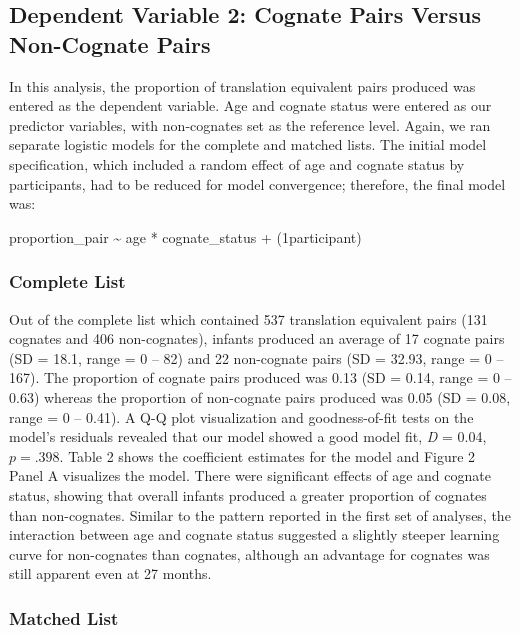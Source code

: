 \documentclass[
  ,man,floatsintext]{apa6}
\begin{document}
\hypertarget{dependent-variable-2-cognate-pairs-versus-non-cognate-pairs}{%
\subsection{Dependent Variable 2: Cognate Pairs Versus Non-Cognate Pairs}\label{dependent-variable-2-cognate-pairs-versus-non-cognate-pairs}}

In this analysis, the proportion of translation equivalent pairs produced was entered as the dependent variable. Age and cognate status were entered as our predictor variables, with non-cognates set as the reference level. Again, we ran separate logistic models for the complete and matched lists. The initial model specification, which included a random effect of age and cognate status by participants, had to be reduced for model convergence; therefore, the final model was:

proportion\_pair \textasciitilde{} age * cognate\_status + (1\textbar participant)

\hypertarget{complete-list-1}{%
\subsubsection{Complete List}\label{complete-list-1}}

Out of the complete list which contained 537 translation equivalent pairs (131 cognates and 406 non-cognates), infants produced an average of 17 cognate pairs (SD = 18.1, range = 0 -- 82) and 22 non-cognate pairs (SD = 32.93, range = 0 -- 167). The proportion of cognate pairs produced was 0.13 (SD = 0.14, range = 0 -- 0.63) whereas the proportion of non-cognate pairs produced was 0.05 (SD = 0.08, range = 0 -- 0.41). A Q-Q plot visualization and goodness-of-fit tests on the model's residuals revealed that our model showed a good model fit, \emph{D} = 0.04, \(p = .398\). Table 2 shows the coefficient estimates for the model and Figure 2 Panel A visualizes the model. There were significant effects of age and cognate status, showing that overall infants produced a greater proportion of cognates than non-cognates. Similar to the pattern reported in the first set of analyses, the interaction between age and cognate status suggested a slightly steeper learning curve for non-cognates than cognates, although an advantage for cognates was still apparent even at 27 months.

\hypertarget{matched-list-1}{%
\subsubsection{Matched List}\label{matched-list-1}}
\end{document}
